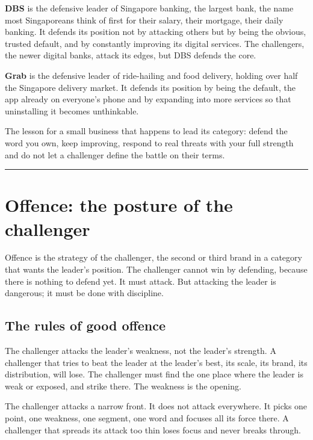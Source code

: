 \documentclass[10pt,twoside,openany]{memoir}
\newcommand{\needspacehead}{\needspace{4\baselineskip}}
\let\oldsection\section
\renewcommand{\section}{\needspacehead\oldsection}
\begin{document}
{\textbf{DBS} is the defensive leader of Singapore banking, the largest
bank, the name most Singaporeans think of first for their salary, their
mortgage, their daily banking. It defends its position not by attacking
others but by being the obvious, trusted default, and by constantly
improving its digital services. The challengers, the newer digital
banks, attack its edges, but DBS defends the core.

\textbf{Grab} is the defensive leader of ride-hailing and food delivery,
holding over half the Singapore delivery market. It defends its position
by being the default, the app already on everyone's phone and by
expanding into more services so that uninstalling it becomes
unthinkable.

The lesson for a small business that happens to lead its category:
defend the word you own, keep improving, respond to real threats with
your full strength and do not let a challenger define the battle on
their terms.

\begin{center}\rule{0.5\linewidth}{0.5pt}\end{center}

\FloatBarrier
\chapter{Offence: the posture of the
challenger}\label{offence-the-posture-of-the-challenger}

Offence is the strategy of the challenger, the second or third brand in
a category that wants the leader's position. The challenger cannot win
by defending, because there is nothing to defend yet. It must attack.
But attacking the leader is dangerous; it must be done with discipline.

\section{The rules of good offence}\label{the-rules-of-good-offence}

The challenger attacks the leader's weakness, not the leader's strength.
A challenger that tries to beat the leader at the leader's best, its
scale, its brand, its distribution, will lose. The challenger must find
the one place where the leader is weak or exposed, and strike there. The
weakness is the opening.

The challenger attacks a narrow front. It does not attack everywhere. It
picks one point, one weakness, one segment, one word and focuses all its
force there. A challenger that spreads its attack too thin loses focus
and never breaks through.

}
\end{document}
